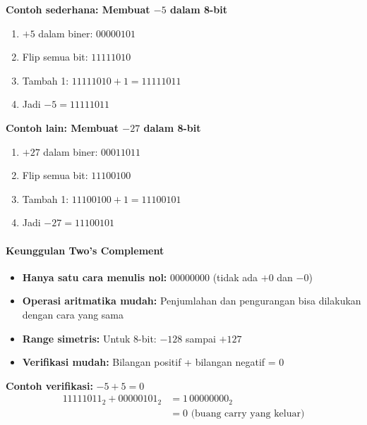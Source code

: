 \documentclass[../main.tex]{subfiles}
\begin{document}
                \textbf{Contoh sederhana: Membuat \(-5\) dalam 8-bit}
                \begin{enumerate}
                    \item \(+5\) dalam biner: \(00000101\)
                    \item Flip semua bit: \(11111010\)
                    \item Tambah 1: \(11111010 + 1 = 11111011\)
                    \item Jadi \(-5 = 11111011\)
                \end{enumerate}

                \textbf{Contoh lain: Membuat \(-27\) dalam 8-bit}
                \begin{enumerate}
                    \item \(+27\) dalam biner: \(00011011\)
                    \item Flip semua bit: \(11100100\)
                    \item Tambah 1: \(11100100 + 1 = 11100101\)
                    \item Jadi \(-27 = 11100101\)
                \end{enumerate}

            \paragraph{Keunggulan Two's Complement}
                \begin{itemize}
                    \item \textbf{Hanya satu cara menulis nol:} \(00000000\) (tidak ada \(+0\) dan \(-0\))
                    \item \textbf{Operasi aritmatika mudah:} Penjumlahan dan pengurangan bisa dilakukan dengan cara yang sama
                    \item \textbf{Range simetris:} Untuk 8-bit: \(-128\) sampai \(+127\)
                    \item \textbf{Verifikasi mudah:} Bilangan positif + bilangan negatif = 0
                \end{itemize}

                \textbf{Contoh verifikasi:} \(-5 + 5 = 0\)
                \begin{align}
                11111011_2 + 00000101_2 &= 1\,00000000_2 \\
                &= 0 \text{ (buang carry yang keluar)}
                \end{align}
\end{document}
